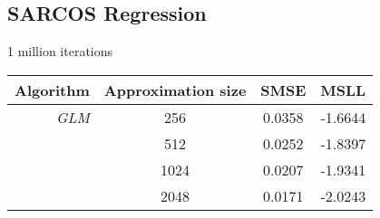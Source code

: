 \documentclass[11pt, oneside]{article}
\begin{document}
\subsection{SARCOS Regression}

1 million iterations

\begin{table}[htb]

    \centering
    \begin{tabular}{r|c|c c}
        \textbf{Algorithm} & \textbf{Approximation size} & \textbf{SMSE} &
        \textbf{MSLL} \\
        \hline
        \emph{GLM} & 256 & 0.0358 & -1.6644 \\
        & 512 & 0.0252 & -1.8397 \\
        & 1024 & 0.0207 & -1.9341 \\
        & 2048 & 0.0171 & -2.0243 \\
        \hline
    \end{tabular}

\end{table}


\end{document}
